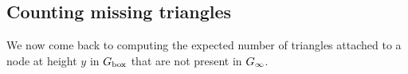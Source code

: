 

\subsection{Counting missing triangles}\label{ssec:missing_triangles}

We now come back to computing the expected number of triangles attached to a node at height $y$ in $G_{\mathrm{box}}$ that are not present in $G_{\infty}$. 

